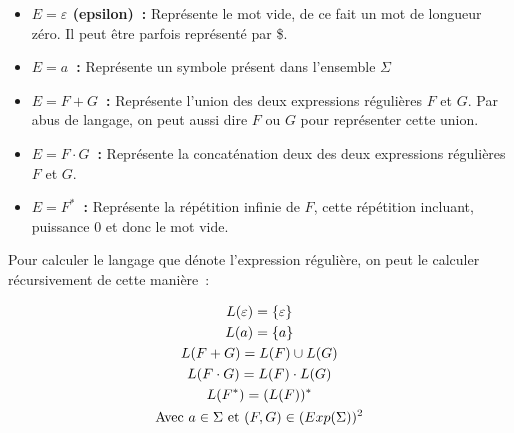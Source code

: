 \vphantom{}

\begin{itemize}
    \item[\textbullet] \textbf{\(E = \varepsilon\) (epsilon)~:}
        Représente le mot vide, de ce fait un mot de longueur zéro. Il peut être
        parfois représenté par \og{}\$\fg{}.

        \vphantom{}

    \item[\textbullet] \textbf{\(E = a\)~:} Représente un symbole
        présent dans l'ensemble \(\Sigma\)

        \vphantom{}

    \item[\textbullet] \textbf{\(E = F + G\)~:} Représente l'union
        des deux expressions régulières \(F\) et \(G\). Par abus de langage, on
        peut aussi dire \(F\) \og{}ou\fg{} \(G\) pour représenter cette union.

        \vphantom{}

    \item[\textbullet] \textbf{\(E = F \cdot G\)~:}
        Représente la concaténation deux des deux expressions régulières
        \(F\) et \(G\).

        \vphantom{}

    \item[\textbullet] \textbf{\(E = F^* \)~:} Représente la
        répétition infinie de \(F\), cette répétition incluant,
        puissance \(0\) et donc le mot vide.
\end{itemize}

\vphantom{}

Pour calculer le langage que dénote l'expression régulière, on peut le calculer
récursivement de cette manière~:

\begin{gather}
    L(\varepsilon) = \{\varepsilon\} \\
    L(a) = \{a\} \\
    L(F + G) = L(F) \cup L(G) \\
    L(F \cdot G) = L(F) \cdot L(G) \\
    L(F^*) = (L(F))^* \\
    \text{Avec } a \in \Sigma \text{ et } (F, G) \in (Exp(\Sigma))^2 \notag
\end{gather}

